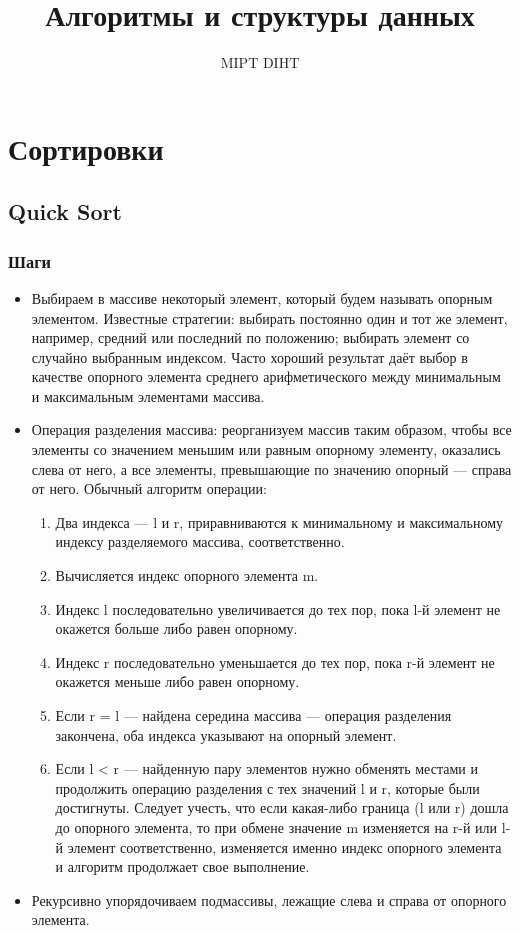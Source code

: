 \documentclass[a4paper]{article}
\title{Алгоритмы и структуры данных}
\author{MIPT DIHT}
\begin{document}
\maketitle

\section{Сортировки}
\subsection{Quick Sort}
\subsubsection{Шаги}
\begin{itemize}
	\item  Выбираем в массиве некоторый элемент, который будем называть опорным элементом. Известные стратегии: выбирать постоянно один и тот же элемент, например, средний или последний по положению; выбирать элемент со случайно выбранным индексом. Часто хороший результат даёт выбор в качестве опорного элемента среднего арифметического между минимальным и максимальным элементами массива.
	\item Операция разделения массива: реорганизуем массив таким образом, чтобы все элементы со значением меньшим или равным опорному элементу, оказались слева от него, а все элементы, превышающие по значению опорный — справа от него. Обычный алгоритм операции:
	\begin{enumerate}
		\item Два индекса — l и r, приравниваются к минимальному и максимальному индексу разделяемого массива, соответственно.
		\item Вычисляется индекс опорного элемента m.
		\item Индекс l последовательно увеличивается до тех пор, пока l-й элемент не окажется больше либо равен опорному.
		\item Индекс r последовательно уменьшается до тех пор, пока r-й элемент не окажется меньше либо равен опорному.
		\item Если r = l — найдена середина массива — операция разделения закончена, оба индекса указывают на опорный элемент.
		\item Если l < r — найденную пару элементов нужно обменять местами и продолжить операцию разделения с тех значений l и r, которые были достигнуты. Следует учесть, что если какая-либо граница (l или r) дошла до опорного элемента, то при обмене значение m изменяется на r-й или l-й элемент соответственно, изменяется именно индекс опорного элемента и алгоритм продолжает свое выполнение.
	\end{enumerate}
	\item Рекурсивно упорядочиваем подмассивы, лежащие слева и справа от опорного элемента.

\end{itemize}
\end{document}
